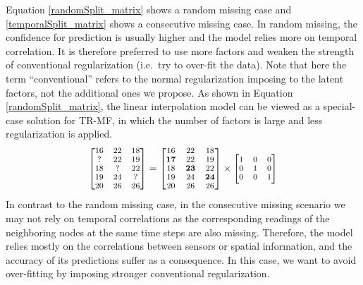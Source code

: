 Equation \ref{randomSplit_matrix} shows a random missing case and \ref{temporalSplit_matrix} shows a consecutive missing case.
In random missing, the confidence for prediction is usually higher and the model relies more on temporal correlation.
It is therefore preferred to use more factors and weaken the strength of conventional regularization (i.e.\ try to over-fit the data).
Note that here the term ``conventional'' refers to the normal regularization imposing to the latent factors, not the additional ones we propose. 
As shown in Equation \ref{randomSplit_matrix}, the linear interpolation model can be viewed as a special-case solution for TR-MF, in which the number of factors is large and less regularization is applied. 
\begin{equation}
\small
\label{randomSplit_matrix}
\begin{bmatrix}
16 & 22 & 18\\
 ? & 22 & 19\\
18 &  ?	& 22\\
19 & 24 &  ?\\
20 & 26 & 26\\
\end{bmatrix} 
= 
\begin{bmatrix}
16 & 22 & 18\\
\mathbf{17} & 22 & 19\\
18 & \mathbf{23}	& 22\\
19 & 24 & \mathbf{24}\\
20 & 26 & 26\\
\end{bmatrix} 
\times
\begin{bmatrix}
1 & 0 & 0\\
0 & 1 & 0\\
0 & 0 & 1\\
\end{bmatrix} 
\end{equation}
In contrast to the random missing case, in the consecutive missing scenario we may not rely on temporal correlations as the corresponding readings of the neighboring nodes at the same time steps are also missing.
Therefore, the model relies mostly on the correlations between sensors or spatial information, and the accuracy of its predictions suffer as a consequence.
In this case, we want to avoid over-fitting by imposing stronger conventional regularization.
